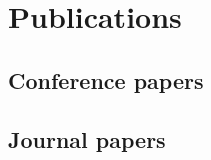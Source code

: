 \chapter{Publications}
\label{chap:publications}

\begin{refsection}
	\section*{Conference papers}
	\section*{Journal papers}
\end{refsection}